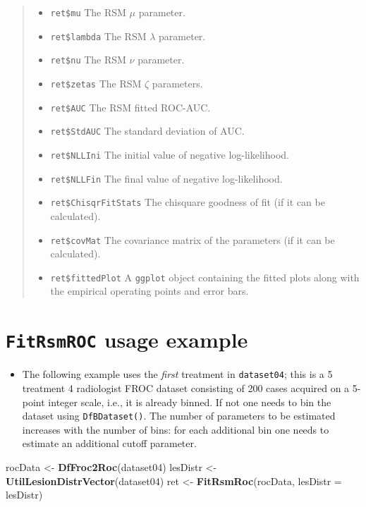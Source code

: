\documentclass[
]{book}
\newenvironment{Shaded}{\begin{snugshade}}{\end{snugshade}}
\newcommand{\DataTypeTok}[1]{\textcolor[rgb]{0.13,0.29,0.53}{#1}}
\newcommand{\KeywordTok}[1]{\textcolor[rgb]{0.13,0.29,0.53}{\textbf{#1}}}
\newcommand{\NormalTok}[1]{#1}
\newcommand{\StringTok}[1]{\textcolor[rgb]{0.31,0.60,0.02}{#1}}
\providecommand{\tightlist}{%
  \setlength{\itemsep}{0pt}\setlength{\parskip}{0pt}}
\begin{document}
\begin{quote}
\begin{itemize}
\tightlist
\item
  \texttt{ret\$mu} The RSM \(\mu\) parameter.
\item
  \texttt{ret\$lambda} The RSM \(\lambda\) parameter.
\item
  \texttt{ret\$nu} The RSM \(\nu\) parameter.
\item
  \texttt{ret\$zetas} The RSM \(\zeta\) parameters.
\item
  \texttt{ret\$AUC} The RSM fitted ROC-AUC.
\item
  \texttt{ret\$StdAUC} The standard deviation of AUC.
\item
  \texttt{ret\$NLLIni} The initial value of negative log-likelihood.
\item
  \texttt{ret\$NLLFin} The final value of negative log-likelihood.
\item
  \texttt{ret\$ChisqrFitStats} The chisquare goodness of fit (if it can be calculated).
\item
  \texttt{ret\$covMat} The covariance matrix of the parameters (if it can be calculated).
\item
  \texttt{ret\$fittedPlot} A \texttt{ggplot} object containing the fitted plots along with the empirical operating points and error bars.
\end{itemize}
\end{quote}

\hypertarget{rsm-fitting-fitrsmroc-usage-example}{%
\section{\texorpdfstring{\texttt{FitRsmROC} usage example}{FitRsmROC usage example}}\label{rsm-fitting-fitrsmroc-usage-example}}

\begin{itemize}
\tightlist
\item
  The following example uses the \emph{first} treatment in \texttt{dataset04}; this is a 5 treatment 4 radiologist FROC dataset \citep{zanca2009evaluation} consisting of 200 cases acquired on a 5-point integer scale, i.e., it is already binned. If not one needs to bin the dataset using \texttt{DfBDataset()}. The number of parameters to be estimated increases with the number of bins: for each additional bin one needs to estimate an additional cutoff parameter.
\end{itemize}

\begin{Shaded}
\begin{Highlighting}[]
\NormalTok{rocData <-}\StringTok{ }\KeywordTok{DfFroc2Roc}\NormalTok{(dataset04)}
\NormalTok{lesDistr <-}\StringTok{ }\KeywordTok{UtilLesionDistrVector}\NormalTok{(dataset04)}
\NormalTok{ret <-}\StringTok{ }\KeywordTok{FitRsmRoc}\NormalTok{(rocData, }\DataTypeTok{lesDistr =}\NormalTok{ lesDistr)}
\end{Highlighting}
\end{Shaded}
\end{document}
